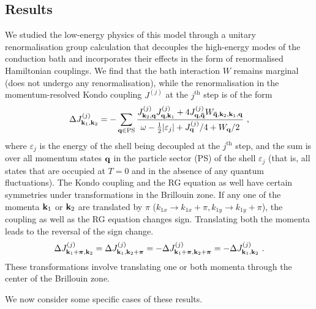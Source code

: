 \documentclass[reprint,hidelinks]{revtex4-2}
\begin{document}
\subsection{Results}
We studied the low-energy physics of this model through a unitary renormalisation group calculation that decouples the high-energy modes of the conduction bath and incorporates their effects in the form of renormalised Hamiltonian couplings. We find that the bath interaction \(W\) remains marginal (does not undergo any renormalisation), while the renormalisation in the momentum-resolved Kondo coupling \(J^{(j)}\) at the \(j^\text{th}\) step is of the form
\begin{equation}\begin{aligned}\label{KondoRGequation}
	\Delta J^{(j)}_{{\bf k}_1, {\bf k}_2} = -\sum_{{\bf q} \in \text{PS}} \frac{J^{(j)}_{{\bf k}_2,{\bf q}} J^{(j)}_{{\bf q},{\bf k}_1} + 4J^{(j)}_{{\bf q}, {\bf \bar q}} W_{{\bf \bar q}, {\bf k}_2, {\bf k}_1, {\bf q}}}{\omega - \frac{1}{2}|\varepsilon_j| + J^{(j)}_{{\bf q}}/4 + W_{{\bf q}}/2}~,
\end{aligned}\end{equation}
where \(\varepsilon_j\) is the energy of the shell being decoupled at the \(j^\text{th}\) step, and the sum is over all momentum states \({\bf q}\) in the particle sector (PS) of the shell \(\varepsilon_j\) (that is, all states that are occupied at \(T=0\) and in the absence of any quantum fluctuations). The Kondo coupling and the RG equation as well have certain symmetries under transformations in the Brillouin zone. If any one of the momenta \({\bf k}_1\) or \({\bf k}_2\) are translated by \(\pi\) (\(k_{1x} \to k_{1x} + \pi, k_{1y} \to k_{1y}+\pi\)), the coupling as well as the RG equation changes sign. Translating both the momenta leads to the reversal of the sign change. 
\begin{equation}\begin{aligned}
	\Delta J^{(j)}_{{\bf k}_1 + \boldsymbol{\pi}, {\bf k}_2} = \Delta J^{(j)}_{{\bf k}_1, {\bf k}_2 + \boldsymbol{\pi}} = -\Delta J^{(j)}_{{\bf k}_1 + \boldsymbol{\pi}, {\bf k}_2 + \boldsymbol{\pi}} = -\Delta J^{(j)}_{{\bf k}_1, {\bf k}_2}~.
\end{aligned}\end{equation}
These transformations involve translating one or both momenta through the center of the Brillouin zone.

We now consider some specific cases of these results.
\end{document}
